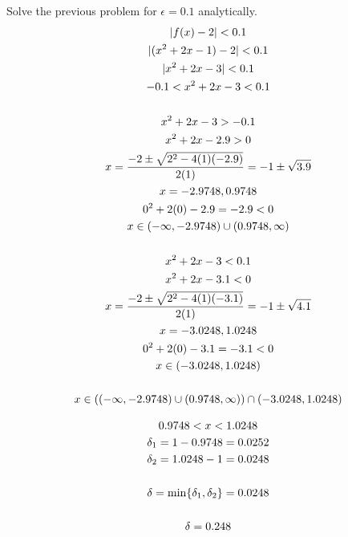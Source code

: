 \documentclass[letterpaper,12pt,fleqn]{article}
\newcommand{\e}{\epsilon}
\renewcommand{\d}{\delta}
\begin{document}
\begin{example}
  Solve the previous problem for \(\e=0.1\) analytically.
  \begin{gather*}
    \lvert f(x)-2\rvert<0.1 \\
    \lvert(x^2+2x-1)-2\rvert<0.1 \\
    \lvert x^2+2x-3\rvert<0.1 \\
    -0.1<x^2+2x-3<0.1 \\
    \\
    x^2+2x-3>-0.1 \\
    x^2+2x-2.9>0 \\
    x=\frac{-2\pm\sqrt{2^2-4(1)(-2.9)}}{2(1)}=-1\pm\sqrt{3.9} \\
    x=-2.9748,0.9748 \\
    0^2+2(0)-2.9=-2.9<0 \\
    x\in(-\infty,-2.9748)\cup(0.9748,\infty) \\
    \\
    x^2+2x-3<0.1 \\
    x^2+2x-3.1<0 \\
    x=\frac{-2\pm\sqrt{2^2-4(1)(-3.1)}}{2(1)}=-1\pm\sqrt{4.1} \\
    x=-3.0248,1.0248 \\
    0^2+2(0)-3.1=-3.1<0 \\
    x\in(-3.0248,1.0248) \\
    \\
    x\in((-\infty,-2.9748)\cup(0.9748,\infty))\cap(-3.0248,1.0248)
  \end{gather*}
  \begin{center}
  \end{center}
  \begin{gather*}
    0.9748<x<1.0248
    \\
    \d_1=1-0.9748=0.0252 \\
    \d_2=1.0248-1=0.0248 \\
    \\
    \d=\min\set{\d_1,\d_2}=0.0248 \\
    \\
    \d=0.248
  \end{gather*}
\end{example}
\end{document}
